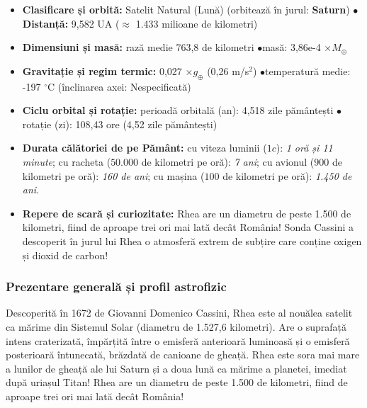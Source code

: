 \begin{tcolorbox}[orbitardata, title={\textbf{Repere esențiale: Rhea}}]
\small
\begin{itemize}[leftmargin=1.4em, itemsep=2pt, topsep=2pt]
  \item \textbf{Clasificare și orbită:} Satelit Natural (Lună) (orbitează în jurul: \textbf{Saturn}) \quad$\bullet$\quad \textbf{Distanță:} 9,582 UA ($\approx$ 1.433 milioane de kilometri)
  \item \textbf{Dimensiuni și masă:} rază medie 763,8 de kilometri \quad$\bullet$\quad masă: 3,86e-4 $\times M_\oplus$
  \item \textbf{Gravitație și regim termic:} 0,027 $\times g_\oplus$ (0,26 m/s$^2$) \quad$\bullet$\quad temperatură medie: -197 $^\circ$C (înclinarea axei: Nespecificată)
  \item \textbf{Ciclu orbital și rotație:} perioadă orbitală (an): 4,518 zile pământești \quad$\bullet$\quad rotație (zi): 108,43 ore (4,52 zile pământești)
  \item \textbf{Durata călătoriei de pe Pământ:} cu viteza luminii ($1c$): \emph{1 oră și 11 minute}; cu racheta ($50.000$ de kilometri pe oră): \emph{7 ani}; cu avionul ($900$ de kilometri pe oră): \emph{160 de ani}; cu mașina ($100$ de kilometri pe oră): \emph{1.450 de ani}.
  \item \textbf{Repere de scară și curiozitate:} Rhea are un diametru de peste 1.500 de kilometri, fiind de aproape trei ori mai lată decât România! Sonda Cassini a descoperit în jurul lui Rhea o atmosferă extrem de subțire care conține oxigen și dioxid de carbon!
\end{itemize}
\end{tcolorbox}

\subsubsection*{Prezentare generală și profil astrofizic}
Descoperită în 1672 de Giovanni Domenico Cassini, Rhea este al nouălea satelit ca mărime din Sistemul Solar (diametru de 1.527,6 kilometri). Are o suprafață intens craterizată, împărțită între o emisferă anterioară luminoasă și o emisferă posterioară întunecată, brăzdată de canioane de gheață. Rhea este sora mai mare a lunilor de gheață ale lui Saturn și a doua lună ca mărime a planetei, imediat după uriașul Titan! Rhea are un diametru de peste 1.500 de kilometri, fiind de aproape trei ori mai lată decât România!


